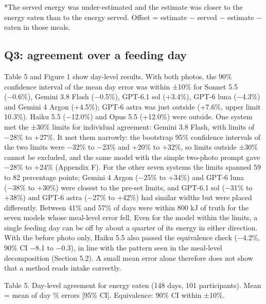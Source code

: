 \documentclass[
  11pt,
  letterpaper]{article}
\begin{document}
*The served energy was under-estimated and the estimate was closer to the energy eaten than to the energy
served. Offset = \textbar estimate − served\textbar{} − \textbar estimate − eaten\textbar{} in those meals.

\subsection{Q3: agreement over a feeding day}\label{q3-agreement-over-a-feeding-day}

Table 5 and Figure 1 show day-level results. With both photos, the 90\% confidence interval of the mean day
error was within ±10\% for Sonnet 5.5 (−0.6\%), Gemini 3.8 Flash (−0.5\%), GPT-6.1 sol (+3.4\%), GPT-6 luna
(−4.3\%) and Gemini 4 Argon (+4.5\%); GPT-6 astra was just outside (+7.6\%, upper limit 10.3\%). Haiku 5.5
(−12.0\%) and Opus 5.5 (+12.0\%) were outside. One system met the ±30\% limits for individual agreement:
Gemini 3.8 Flash, with limits of −28\% to +27\%. It met them narrowly: the bootstrap 95\% confidence intervals
of the two limits were −32\% to −23\% and +20\% to +32\%, so limits outside ±30\% cannot be excluded, and the
same model with the simple two-photo prompt gave −28\% to +24\% (Appendix F). For the other seven systems the
limits spanned 59 to 82 percentage points; Gemini 4 Argon (−25\% to +34\%) and GPT-6 luna (−38\% to +30\%)
were closest to the pre-set limits, and GPT-6.1 sol (−31\% to +38\%) and GPT-6 astra (−27\% to +42\%) had
similar widths but were placed differently. Between 41\% and 57\% of days were within 800 kJ of truth for the
seven models whose meal-level error fell. Even for the model within the limits, a single feeding day can be
off by about a quarter of its energy in either direction. With the before photo only, Haiku 5.5 also passed
the equivalence check (−4.2\%, 90\% CI −8.1 to −0.3), in line with the pattern seen in the meal-level
decomposition (Section 5.2). A small mean error alone therefore does not show that a method reads intake
correctly.

Table 5. Day-level agreement for energy eaten (148 days, 101 participants). Mean = mean of day \% errors
{[}95\% CI{]}. Equivalence: 90\% CI within ±10\%.
\end{document}
